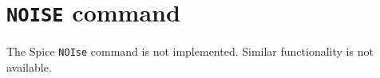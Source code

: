 \section{{\tt NOISE} command}
The Spice {\tt NOIse} command is not implemented.  Similar functionality is
not available.
